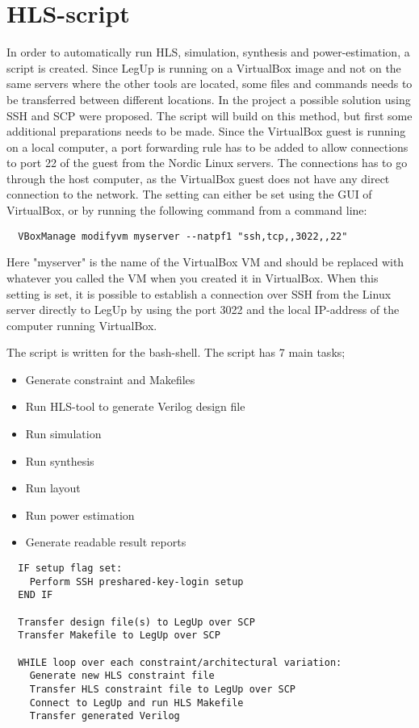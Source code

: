 \section{HLS-script}
In order to automatically run HLS, simulation, synthesis and power-estimation, a script is created. Since LegUp is running on a VirtualBox image and not on the same servers where the other tools are located, some files and commands needs to be transferred between different locations. In the project \cite{holm2015pro} a possible solution using SSH and SCP were proposed. The script will build on this method, but first some additional preparations needs to be made. Since the VirtualBox guest is running on a local computer, a port forwarding rule has to be added to allow connections to port 22 of the guest from the Nordic Linux servers. The connections has to go through the host computer, as the VirtualBox guest does not have any direct connection to the network. The setting can either be set using the GUI of VirtualBox, or by running the following command from a command line:
\begin{verbatim}
  VBoxManage modifyvm myserver --natpf1 "ssh,tcp,,3022,,22"  
\end{verbatim}
Here "myserver" is the name of the VirtualBox VM and should be replaced with whatever you called the VM when you created it in VirtualBox. When this setting is set, it is possible to establish a connection over SSH from the Linux server directly to LegUp by using the port 3022 and the local IP-address of the computer running VirtualBox.


The script is written for the bash-shell. The script has 7 main tasks; 
\begin{itemize}
    \item Generate constraint and Makefiles
    \item Run HLS-tool to generate Verilog design file
    \item Run simulation
    \item Run synthesis
    \item Run layout
    \item Run power estimation
    \item Generate readable result reports
\end{itemize}

\begin{verbatim}
  IF setup flag set:
    Perform SSH preshared-key-login setup
  END IF
  
  Transfer design file(s) to LegUp over SCP
  Transfer Makefile to LegUp over SCP
  
  WHILE loop over each constraint/architectural variation:
    Generate new HLS constraint file
    Transfer HLS constraint file to LegUp over SCP
    Connect to LegUp and run HLS Makefile
    Transfer generated Verilog
\end{verbatim}

